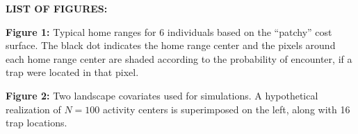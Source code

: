\documentclass[12pt]{article}
\begin{document}

\newpage

{\flushleft \bf LIST OF FIGURES:}

\vspace{.2in}


{\flushleft \bf
Figure 1:}
Typical home ranges for 6 individuals based on the ``patchy'' cost surface.
The black dot indicates the home
  range center and the pixels around each home range center are shaded
according to the probability of encounter, if a trap were located in
that pixel.



\vspace{.2in}


{\flushleft \bf Figure 2:}
Two landscape covariates used for simulations. A hypothetical
  realization of $N=100$ activity centers is superimposed on the left,
along with 16 trap locations.


\newpage


\end{document}
